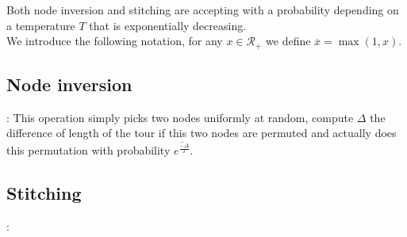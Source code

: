 \documentclass[fontsize=9pt,twocolumns,enabledeprecatedfontcommands]{scrartcl}
\begin{document}
Both node inversion and stitching are accepting with a probability depending on a temperature $T$ that is exponentially decreasing.\\

We introduce the following notation, for any $x \in \mathcal{R}_+$ we define $\overline{x} = \max(1,x)$.

\subsection{Node inversion}:
This operation simply picks two nodes uniformly at random, compute $\Delta$ the difference of length of the tour if this two nodes are permuted and actually does this permutation with probability $\overline{e^{\frac{-\Delta}{T}}}$.

\subsection{Stitching}:
\end{document}
